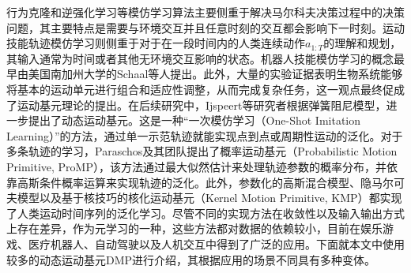 行为克隆和逆强化学习等模仿学习算法主要侧重于解决马尔科夫决策过程中的决策问题，其主要特点是需要与环境交互并且任意时刻的交互都会影响下一时刻。运动技能轨迹模仿学习则侧重于对于在一段时间内的人类连续动作$a_{1:T}$的理解和规划，其输入通常为时间或者其他无环境交互影响的状态\cite{HuangJiQiRenYunDongGuiJiDeMoFangXueXiZongShu}。机器人技能模仿学习的概念最早由美国南加州大学的Schaal等人\cite{schaalImitationLearningRoute1999}提出。此外，大量的实验证据表明生物系统能够将基本的运动单元进行组合和适应性调整，从而完成复杂任务，这一观点最终促成了运动基元理论的提出\cite{saverianoDynamicMovementPrimitives2023}。在后续研究中，Ijspeert等研究者\cite{ijspeertDynamicalMovementPrimitives2013,righettiDynamicHebbianLearning2006}根据弹簧阻尼模型，进一步提出了动态运动基元。这是一种“一次模仿学习（One-Shot Imitation Learning）”的方法，通过单一示范轨迹就能实现点到点或周期性运动的泛化。对于多条轨迹的学习，Paraschos及其团队提出了概率运动基元（Probabilistic Motion Primitive, ProMP），该方法通过最大似然估计来处理轨迹参数的概率分布，并依靠高斯条件概率运算来实现轨迹的泛化。此外，参数化的高斯混合模型\cite{paraschosProbabilisticMovementPrimitives2013}、隐马尔可夫模型\cite{rabinerIntroductionHiddenMarkov1986}以及基于核技巧的核化运动基元（Kernel Motion Primitive, KMP）\cite{huangKernelizedMovementPrimitives2019}都实现了人类运动时间序列的泛化学习。尽管不同的实现方法在收敛性以及输入输出方式上存在差异，作为元学习的一种，这些方法都对数据的依赖较小，目前在娱乐游戏、医疗机器人、自动驾驶以及人机交互中得到了广泛的应用。下面就本文中使用较多的动态运动基元DMP进行介绍，其根据应用的场景不同具有多种变体。

